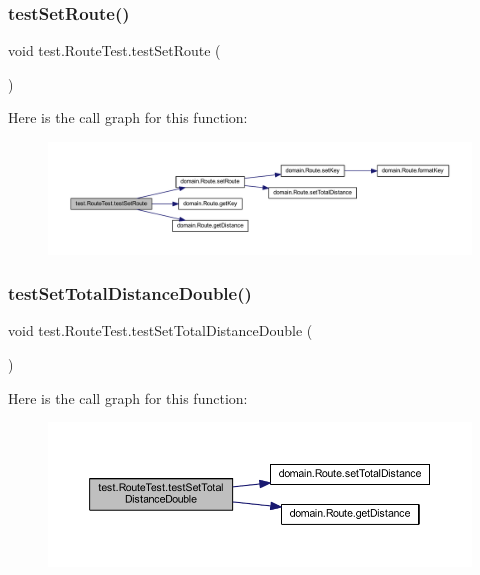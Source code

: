 \subsubsection{\texorpdfstring{test\+Set\+Route()}{testSetRoute()}}
{\footnotesize\ttfamily void test.\+Route\+Test.\+test\+Set\+Route (\begin{DoxyParamCaption}{ }\end{DoxyParamCaption})}

Here is the call graph for this function\+:\nopagebreak
\begin{figure}[H]
\begin{center}
\leavevmode
\includegraphics[width=350pt]{classtest_1_1_route_test_ac1ec1e0a746b686d4e3c2ced9224b8d7_cgraph}
\end{center}
\end{figure}
\mbox{\label{classtest_1_1_route_test_aba13b05ba3749e36d917203df57c0c4f}} 
\subsubsection{\texorpdfstring{test\+Set\+Total\+Distance\+Double()}{testSetTotalDistanceDouble()}}
{\footnotesize\ttfamily void test.\+Route\+Test.\+test\+Set\+Total\+Distance\+Double (\begin{DoxyParamCaption}{ }\end{DoxyParamCaption})}

Here is the call graph for this function\+:\nopagebreak
\begin{figure}[H]
\begin{center}
\leavevmode
\includegraphics[width=350pt]{classtest_1_1_route_test_aba13b05ba3749e36d917203df57c0c4f_cgraph}
\end{center}
\end{figure}
\mbox{\label{classtest_1_1_route_test_a8e80ff61aae3fce1b14e526b8b09ca40}} 
